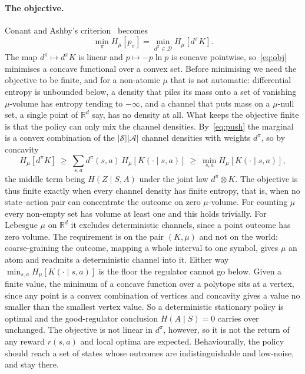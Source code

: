 \documentclass[11pt]{article}
\theoremstyle{remark}
\newcommand{\Acal}{\mathcal A}
\newcommand{\Scal}{\mathcal S}
\newcommand{\Dcal}{\mathcal D}
\newcommand{\1}{\mathds{1}}
\newcommand{\occ}{d^{\pi}}
\newcommand{\pz}{p_{\pi}}
\newcommand{\Hf}[1]{H_{\mu}\!\left[#1\right]}
\begin{document}
\paragraph{The objective.}
Conant and Ashby's criterion~\citep{Conant-good70} becomes
\begin{equation}
  \min_{\pi}\Hf{\pz}=\min_{\occ\in\Dcal}\Hf{\occ K}.
  \label{eq:obj}
\end{equation}
The map $\occ\mapsto\occ K$ is linear and $p\mapsto-p\ln p$ is concave pointwise, so~\eqref{eq:obj} minimises a concave functional over a convex set.
{\color{blue!70!black}
Before minimising we need the objective to be finite, and for a non-atomic $\mu$ that is not automatic: differential entropy is unbounded below, a density that piles its mass onto a set of vanishing $\mu$-volume has entropy tending to $-\infty$, and a channel that puts mass on a $\mu$-null set, a single point of $\mathbb R^d$ say, has no density at all.
What keeps the objective finite is that the policy can only mix the channel densities.
By~\eqref{eq:push} the marginal is a convex combination of the $|\Scal||\Acal|$ channel densities with weights $\occ$, so by concavity
\begin{equation}
  \Hf{\occ K}\ \ge\ \sum_{s,a}\occ(s,a)\,\Hf{K(\cdot\mid s,a)}\ \ge\ \min_{s,a}\Hf{K(\cdot\mid s,a)} ,
  \label{eq:floor}
\end{equation}
the middle term being $H(Z\mid S,A)$ under the joint law $\occ\otimes K$.
The objective is thus finite exactly when every channel density has finite entropy, that is, when no state--action pair can concentrate the outcome on zero $\mu$-volume.
For counting $\mu$ every non-empty set has volume at least one and this holds trivially.
For Lebesgue $\mu$ on $\mathbb R^d$ it excludes deterministic channels, since a point outcome has zero volume.
The requirement is on the pair $(K,\mu)$ and not on the world: coarse-graining the outcome, mapping a whole interval to one symbol, gives $\mu$ an atom and readmits a deterministic channel into it.
Either way $\min_{s,a}\Hf{K(\cdot\mid s,a)}$ is the floor the regulator cannot go below.
}
Given a finite value, the minimum of a concave function over a polytope sits at a vertex, since any point is a convex combination of vertices and concavity gives a value no smaller than the smallest vertex value.
So a deterministic stationary policy is optimal and the good-regulator conclusion $H(A\mid S)=0$ carries over unchanged.
The objective is not linear in $\occ$, however, so it is not the return of any reward $r(s,a)$ and local optima are expected.
Behaviourally, the policy should reach a set of states whose outcomes are indistinguishable and low-noise, and stay there.
\end{document}
